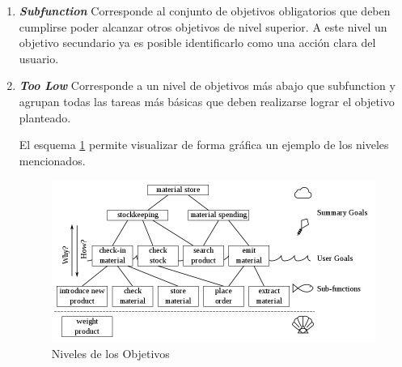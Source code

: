\begin{enumerate}
\begin{enumerate}
      \item \textbf{\textit{Subfunction}} Corresponde al conjunto de objetivos obligatorios que deben cumplirse poder alcanzar otros objetivos de nivel superior. A este nivel un objetivo secundario ya es posible identificarlo como una acción clara del usuario.
      \item \textbf{\textit{Too Low}} Corresponde a un nivel de objetivos más abajo que subfunction y agrupan todas las tareas más básicas que deben realizarse lograr el objetivo planteado.

      El esquema \ref{fig:use_cases_levels} permite visualizar de forma gráfica un ejemplo de los niveles mencionados.

      \begin{figure}[ht]
      	\begin{center}
        \includegraphics[width=1\textwidth]{./figures/chapter_02/09_cockburnstyle_use_cases.png}
        \caption{Niveles de los Objetivos}
        \label{fig:use_cases_levels}
      	\end{center}
      \end{figure}


\end{enumerate}
\end{enumerate}
